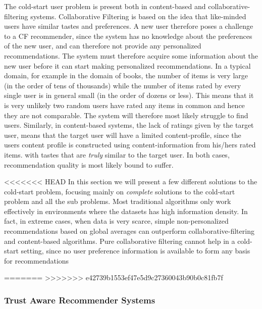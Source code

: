 The cold-start user problem is present both in content-based and
collaborative-filtering systems. Collaborative Filtering is based on the idea that like-minded users have similar tastes and
preferences. A new user therefore poses a challenge to a CF recommender, since
the system has no knowledge about the preferences of the new user, and can
therefore not provide any personalized recommendations. The system must therefore acquire some
information about the new user before it can start making personalized recommendations. In a typical domain, for example in the domain of books, the number of items is very large (in the order of tens of thousands) while the number of items rated by every single user is in general small (in the order of dozens or less). This means that it is very unlikely two random users have rated any items in common and hence they are not comparable. The system will therefore most likely struggle to find users. Similarly, in content-based systems, the lack of ratings
given by the target user, means that the target user will have a limited
content-profile, since the users content profile is constructed using content-information from his/hers rated items.
with tastes that are \emph{truly} similar to the target user. In both cases, recommendation quality is most likely bound to suffer.

<<<<<<< HEAD
In this section we will present a few different solutions to the cold-start problem, focusing mainly on \emph{complete} solutions to the cold-start problem and all the sub problems. Most traditional algorithms only work effectively in environments where
the datasets has high information density. In fact, in extreme cases, when data
is very scarce, simple non-personalized recommendations based on global
averages can outperform collaborative-filtering and content-based algorithms.
Pure collaborative filtering cannot help in a cold-start setting, since no user
preference information is available to form any basis for recommendations



=======
>>>>>>> e42739b1553ef47e5d9c27360043b90b0c81fb7f
\subsubsection{Trust Aware Recommender Systems}

